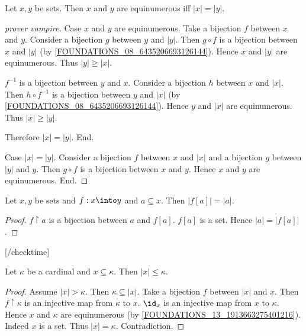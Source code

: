 \documentclass[../set-theory.tex]{subfiles}
\begin{document}
  \begin{forthel}
    \begin{proposition}
      Let $x, y$ be sets.
      Then $x$ and $y$ are equinumerous iff $|x| = |y|$.
    \end{proposition}
    \begin{proof}
      [prover vampire]

      Case $x$ and $y$ are equinumerous.
        Take a bijection $f$ between $x$ and $y$.
        Consider a bijection $g$ between $y$ and $|y|$.
        Then $g \circ f$ is a bijection between $x$ and $|y|$
        (by \cref{FOUNDATIONS_08_6435206693126144}).
        Hence $x$ and $|y|$ are equinumerous.
        Thus $|y| \geq |x|$.

        $f^{-1}$ is a bijection between $y$ and $x$.
        Consider a bijection $h$ between $x$ and $|x|$.
        Then $h \circ f^{-1}$ is a bijection between $y$ and $|x|$
        (by \cref{FOUNDATIONS_08_6435206693126144}).
        Hence $y$ and $|x|$ are equinumerous.
        Thus $|x| \geq |y|$.

        Therefore $|x| = |y|$.
      End.

      Case $|x| = |y|$.
        Consider a bijection $f$ between $x$ and $|x|$ and a bijection $g$
        between $|y|$ and $y$.
        Then $g \circ f$ is a bijection between $x$ and $y$.
        Hence $x$ and $y$ are equinumerous.
      End.
    \end{proof}
  \end{forthel}

  \begin{forthel}
    [checktime 2]

    \begin{proposition}
      Let $x, y$ be sets and $f : x \into y$ and $a \subseteq x$.
      Then $|f[a]| = |a|$.
    \end{proposition}
    \begin{proof}
      $f \restriction a$ is a bijection between $a$ and $f[a]$.
      $f[a]$ is a set.
      Hence $|a| = |f[a]|$.
    \end{proof}

    [/checktime]
  \end{forthel}

  \begin{forthel}
    \begin{proposition}
      Let $\kappa$ be a cardinal and $x \subseteq \kappa$.
      Then $|x| \leq \kappa$.
    \end{proposition}
    \begin{proof}
      Assume $|x| > \kappa$.
      Then $\kappa \subseteq |x|$.
      Take a bijection $f$ between $|x|$ and $x$.
      Then $f \restriction \kappa$ is an injective map from $\kappa$ to $x$.
      $\id_{x}$ is an injective map from $x$ to $\kappa$.
      Hence $x$ and $\kappa$ are equinumerous (by
      \cref{FOUNDATIONS_13_1913663275401216}).
      Indeed $x$ is a set.
      Thus $|x| = \kappa$.
      Contradiction.
    \end{proof}
  \end{forthel}
\end{document}
